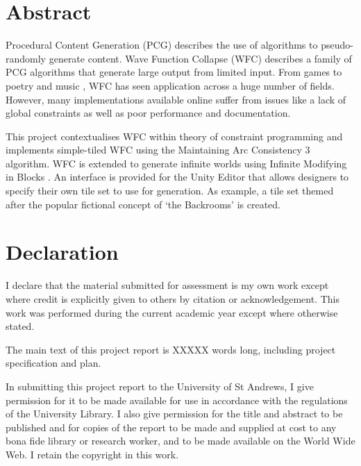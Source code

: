 \section*{Abstract}
Procedural Content Generation (PCG) describes the use of algorithms to pseudo-randomly generate content. Wave Function Collapse (WFC) describes a family of PCG algorithms that generate large output from limited input. From games \cite{townscaper,badnorth,cavesofqud} to poetry \cite{WFC_poetry} and music \cite{WFC_music,WFC_music_2}, WFC has seen application across a huge number of fields. However, many implementations available online suffer from issues like a lack of global constraints as well as poor performance and documentation.

This project contextualises WFC within theory of constraint programming and implements simple-tiled WFC using the Maintaining Arc Consistency 3 algorithm. WFC is extended to generate infinite worlds using Infinite Modifying in Blocks \cite{Infinite_Modifying_In_Blocks}. An interface is provided for the Unity Editor that allows designers to specify their own tile set to use for generation. As example, a tile set themed after the popular fictional concept of `the Backrooms' is created.


\section*{Declaration}
I declare that the material submitted for assessment is my own work except where credit is explicitly given to others by citation or acknowledgement. This work was performed during the current academic year except where otherwise stated.
\par \vspace{\baselineskip}
The main text of this project report is XXXXX words
long, including project specification and plan.
\par \vspace{\baselineskip}
In submitting this project report to the University of St
Andrews, I give permission for it to be made available
for use in accordance with the regulations of the University
Library. I also give permission for the title and abstract
to be published and for copies of the report to be made and
supplied at cost to any bona fide library or research worker,
and to be made available on the World Wide Web. I retain the copyright in this work.

